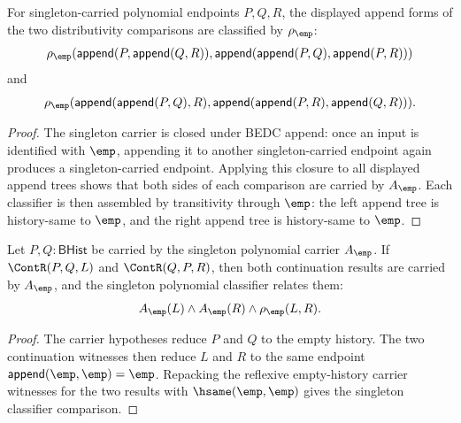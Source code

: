 \begin{theorem}
\label{thm:polynomial-singleton-append-distrib-classified}
For singleton-carried polynomial endpoints $P,Q,R$, the displayed append
forms of the two distributivity comparisons are classified by
$\rho_{\emp}$:
$$
\rho_{\emp}(\mathsf{append}(P,\mathsf{append}(Q,R)),
\mathsf{append}(\mathsf{append}(P,Q),\mathsf{append}(P,R)))
$$
and
$$
\rho_{\emp}(\mathsf{append}(\mathsf{append}(P,Q),R),
\mathsf{append}(\mathsf{append}(P,R),\mathsf{append}(Q,R))).
$$
\end{theorem}
\begin{proof}
The singleton carrier is closed under BEDC append: once an input is identified
with $\emp$, appending it to another singleton-carried endpoint again produces
a singleton-carried endpoint. Applying this closure to all displayed append
trees shows that both sides of each comparison are carried by $A_{\emp}$.
Each classifier is then assembled by transitivity through $\emp$: the left
append tree is history-same to $\emp$, and the right append tree is
history-same to $\emp$.
\end{proof}

\begin{theorem}
\label{thm:polynomial-singleton-classifier-continuation-comm-closed}
Let $P,Q:\mathsf{BHist}$ be carried by the singleton polynomial carrier
$A_{\emp}$. If $\ContR(P,Q,L)$ and $\ContR(Q,P,R)$, then both continuation
results are carried by $A_{\emp}$, and the singleton polynomial classifier
relates them:
$$
A_{\emp}(L)\land A_{\emp}(R)\land \rho_{\emp}(L,R).
$$
\end{theorem}
\begin{proof}
The carrier hypotheses reduce $P$ and $Q$ to the empty history. The two
continuation witnesses then reduce $L$ and $R$ to the same endpoint
$\mathsf{append}(\emp,\emp)=\emp$. Repacking the reflexive empty-history
carrier witnesses for the two results with $\hsame(\emp,\emp)$ gives the
singleton classifier comparison.
\end{proof}

